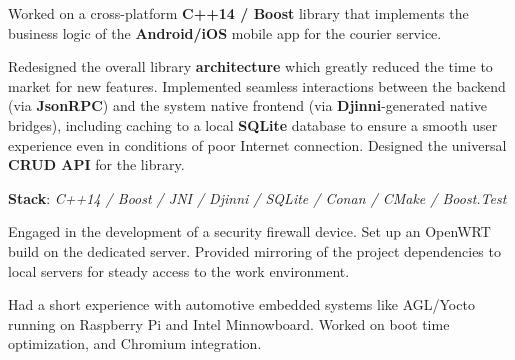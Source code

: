 \documentclass[]{deedy-resume}
\begin{document}
\begin{minipage}[t]{0.70\textwidth}
\sectionspace



Worked on a cross-platform \textbf{C++14 / Boost} library that implements the business logic of the \textbf{Android/iOS} mobile app for the courier service.
\begin{tightitemize}
    \tightitem Redesigned the overall library \textbf{architecture} which greatly reduced the time to market for new features.
    \tightitem Implemented seamless interactions between the backend (via \textbf{JsonRPC}) and the system native frontend (via \textbf{Djinni}-generated native bridges), including caching to a local \textbf{SQLite} database to ensure a smooth user experience even in conditions of poor Internet connection.
    \tightitem Designed the universal \textbf{CRUD API} for the library.
\end{tightitemize}
\textbf{Stack}: \textit{C++14 / Boost / JNI / Djinni / SQLite / Conan / CMake / Boost.Test}

\sectionspace



Engaged in the development of a security firewall device. Set up an OpenWRT build on the dedicated server. Provided mirroring of the project dependencies to local servers for steady access to the work environment.

\sectionspace



Had a short experience with automotive embedded systems like AGL/Yocto running on Raspberry Pi and Intel Minnowboard. Worked on boot time optimization, and Chromium integration.

\sectionspace

\end{minipage}
\end{document}
